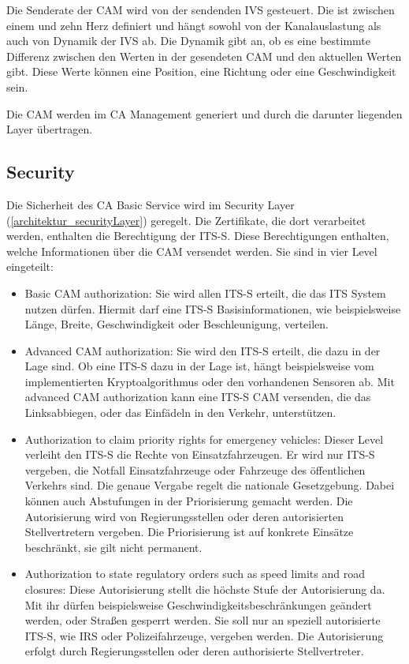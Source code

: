 Die Senderate der \ac{CAM} wird von der sendenden \ac{IVS} gesteuert. Die ist zwischen einem und zehn Herz definiert und hängt sowohl von der Kanalauslastung als auch von Dynamik der \ac{IVS} ab. Die Dynamik gibt an, ob es eine bestimmte Differenz zwischen den Werten in der gesendeten \ac{CAM} und den aktuellen Werten gibt. Diese Werte können eine Position, eine Richtung oder eine Geschwindigkeit sein.

Die \ac{CAM} werden im \ac{CA} Management generiert und durch die darunter liegenden Layer übertragen.

\subsection{Security \label{facilitylayer_CAM-Security}}
Die Sicherheit des \ac{CA} Basic Service wird im Security Layer (\autoref{architektur_securityLayer}) geregelt. Die Zertifikate, die dort verarbeitet werden, enthalten die Berechtigung der \ac{ITS-S}. Diese Berechtigungen enthalten, welche Informationen über die \ac{CAM} versendet werden. Sie sind in vier Level eingeteilt:
\begin{itemize}
	\item Basic \ac{CAM} authorization: Sie wird allen \ac{ITS-S} erteilt, die das \ac{ITS} System nutzen dürfen. Hiermit darf eine \ac{ITS-S} Basisinformationen, wie beispielsweise Länge, Breite, Geschwindigkeit oder Beschleunigung, verteilen. 
	\item Advanced \ac{CAM} authorization: Sie wird den \ac{ITS-S} erteilt, die dazu in der Lage sind. Ob eine \ac{ITS-S} dazu in der Lage ist, hängt beispielsweise vom implementierten Kryptoalgorithmus oder den vorhandenen Sensoren ab. Mit advanced \ac{CAM} authorization kann eine \ac{ITS-S} \ac{CAM} versenden, die das Linksabbiegen, oder das Einfädeln in den Verkehr, unterstützen.
	\item Authorization to claim priority rights for emergency vehicles: Dieser Level verleiht den \ac{ITS-S} die Rechte von Einsatzfahrzeugen. Er wird nur \ac{ITS-S} vergeben, die Notfall Einsatzfahrzeuge oder Fahrzeuge des öffentlichen Verkehrs sind. Die genaue Vergabe regelt die  nationale Gesetzgebung.  Dabei können auch Abstufungen in der Priorisierung gemacht werden. Die Autorisierung wird von Regierungsstellen oder deren autorisierten Stellvertretern vergeben. Die Priorisierung ist  auf konkrete Einsätze beschränkt, sie gilt nicht permanent.
	\item Authorization to state regulatory orders such as speed limits and road closures: Diese Autorisierung stellt die höchste Stufe der Autorisierung da. Mit ihr dürfen beispielsweise Geschwindigkeitsbeschränkungen geändert werden, oder Straßen gesperrt werden. Sie soll nur an speziell autorisierte \ac{ITS-S}, wie \ac{IRS} oder Polizeifahrzeuge, vergeben werden. Die Autorisierung erfolgt durch Regierungsstellen oder deren authorisierte Stellvertreter. 
\end{itemize}
 
